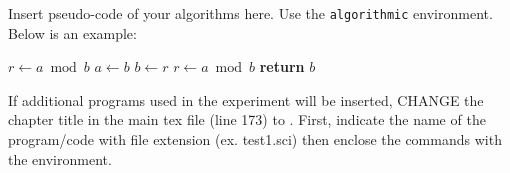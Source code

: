 Insert pseudo-code of your algorithms here. 
Use the \texttt{algorithmic} environment. 
Below is an example:

\begin{algorithm}
\caption{Euclid's algorithm}
\label{algo: euclid}
\begin{algorithmic}[1]
\State $r\gets a\bmod b$
\State $a\gets b$
\State $b\gets r$
\State $r\gets a\bmod b$
\EndWhile\label{euclidendwhile}
\State \textbf{return} $b$
\EndProcedure
\end{algorithmic}
\end{algorithm}

If additional programs used in the experiment will be inserted, CHANGE the chapter title in the main tex file (line 173) to .
First, indicate the name of the program/code with file extension (ex. test1.sci) then enclose the commands with the  environment.
